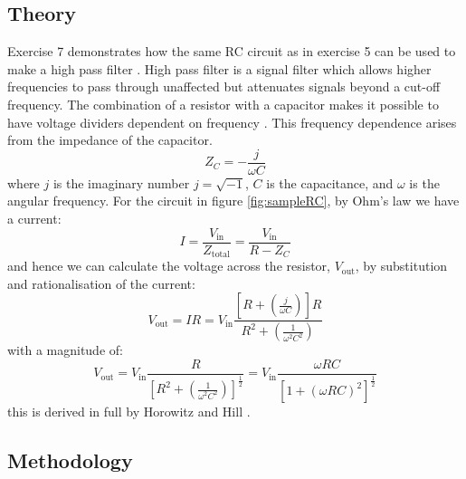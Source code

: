 \documentclass[%
reprint,
amsmath,amssymb,
aps,
floatfix
]{revtex4-2}
\begin{document}
		\subsection{Theory}
		Exercise 7 demonstrates how the same RC circuit as in exercise 5 can be used to make a high pass filter \cite{manual}. High pass filter is a signal filter which allows higher frequencies to pass through unaffected but attenuates signals beyond a cut-off frequency. The combination of a resistor with a capacitor makes it possible to have voltage dividers dependent on frequency \cite{horowitz}. This frequency dependence arises from the impedance of the capacitor.
		\begin{equation}
			Z_C = -\frac{j}{\omega C}
		\end{equation}where $j$ is the imaginary number $j=\sqrt{-1}$, $C$ is the capacitance, and $\omega$ is the angular frequency. For the circuit in figure \ref{fig:sampleRC}, by Ohm's law we have a current:
		\begin{equation}
			I = \frac{V_\text{in}}{Z_\text{total}} = \frac{V_\text{in}}{R - Z_C}
		\end{equation}and hence we can calculate the voltage across the resistor, $V_\text{out}$, by substitution and rationalisation of the current:
		\begin{equation}
			V_\text{out} = I R = V_\text{in}\frac{[R+(\frac{j}{\omega C})]R}{R^2 + (\frac{1}{\omega^2 C^2})}
		\end{equation}with a magnitude of:
		\begin{equation}
			V_\text{out} = V_\text{in}\frac{R}{\left[R^2 + \left(\frac{1}{\omega^2 C^2}\right)\right]^\frac{1}{2}} = V_\text{in} \frac{\omega R C}{\left[1 + \left(\omega RC\right)^2\right]^\frac{1}{2}}
		\end{equation}this is derived in full by Horowitz and Hill \cite{horowitz}.
	
	
		\subsection{Methodology}
\end{document}
